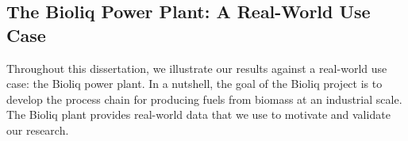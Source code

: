 \subsection{The \acrshort{Bioliq}\texorpdfstring{\textsuperscript{\textregistered}}{} Power Plant: A Real-World Use Case}
\label{sec:bioliqexample}


Throughout this dissertation, we illustrate our results against a real-world use case: the \acrshort{Bioliq} power plant. %
In a nutshell, the goal of the \gls{Bioliq} project is to develop the process chain for producing fuels from biomass at an industrial scale. The \gls{Bioliq} plant provides real-world data that we use to motivate and validate our research. 


